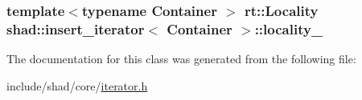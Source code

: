 \hypertarget{classshad_1_1insert__iterator_a5b9dc5f15bd6d1aa377a9befe7f14ae5}{
\subsubsection[{locality\-\_\-}]{\setlength{\rightskip}{0pt plus 5cm}template$<$typename Container $>$ {\bf rt\-::\-Locality} {\bf shad\-::insert\-\_\-iterator}$<$ Container $>$\-::locality\-\_\-\hspace{0.3cm}{\ttfamily [protected]}}}\label{classshad_1_1insert__iterator_a5b9dc5f15bd6d1aa377a9befe7f14ae5}


The documentation for this class was generated from the following file\-:\begin{DoxyCompactItemize}
\item 
include/shad/core/\hyperlink{iterator_8h}{iterator.\-h}\end{DoxyCompactItemize}

